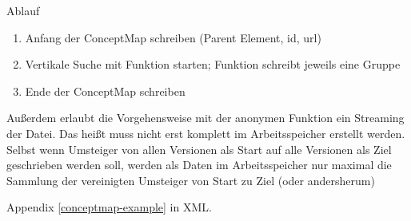 Ablauf

\begin{enumerate}
\item Anfang der ConceptMap schreiben (Parent Element, id, url)
\item Vertikale Suche mit Funktion starten; Funktion schreibt jeweils eine Gruppe
\item Ende der ConceptMap schreiben
\end{enumerate}

Außerdem erlaubt die Vorgehensweise mit der anonymen Funktion ein Streaming der Datei. Das heißt muss nicht erst komplett im Arbeitsspeicher erstellt werden. Selbst wenn Umsteiger von allen Versionen als Start auf alle Versionen als Ziel geschrieben werden soll, werden als Daten im Arbeitsspeicher nur maximal die Sammlung der vereinigten Umsteiger von Start zu Ziel (oder andersherum) 

Appendix \ref{conceptmap-example} in XML.

